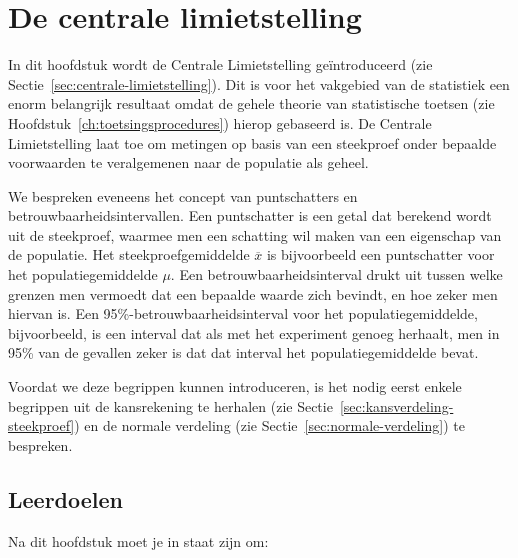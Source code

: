 \chapter{De centrale limietstelling}
\label{ch:centrale-limietstelling}

In dit hoofdstuk wordt de Centrale Limietstelling geïntroduceerd (zie Sectie~\ref{sec:centrale-limietstelling}). Dit is voor het vakgebied van de statistiek een enorm belangrijk resultaat omdat de gehele theorie van statistische toetsen (zie Hoofdstuk~\ref{ch:toetsingsprocedures}) hierop gebaseerd is. De Centrale Limietstelling laat toe om metingen op basis van een steekproef onder bepaalde voorwaarden te veralgemenen naar de populatie als geheel.

We bespreken eveneens het concept van puntschatters en betrouwbaarheidsintervallen. Een puntschatter is een getal dat berekend wordt uit de steekproef, waarmee men een schatting wil maken van een eigenschap van de populatie. Het steekproefgemiddelde $\overline{x}$ is bijvoorbeeld een puntschatter voor het populatiegemiddelde $\mu$. Een betrouwbaarheidsinterval drukt uit tussen welke grenzen men vermoedt dat een bepaalde waarde zich bevindt, en hoe zeker men hiervan is. Een 95\%-betrouwbaarheidsinterval voor het populatiegemiddelde, bijvoorbeeld, is een interval dat als met het experiment genoeg herhaalt, men in 95\% van de gevallen zeker is dat dat interval het populatiegemiddelde bevat.

Voordat we deze begrippen kunnen introduceren, is het nodig eerst enkele begrippen uit de kansrekening te herhalen (zie Sectie~\ref{sec:kansverdeling-steekproef}) en de normale verdeling  (zie Sectie~\ref{sec:normale-verdeling}) te bespreken.

\section{Leerdoelen}
\label{sec:centrale-limietstelling-leerdoelen}

Na dit hoofdstuk moet je in staat zijn om:

